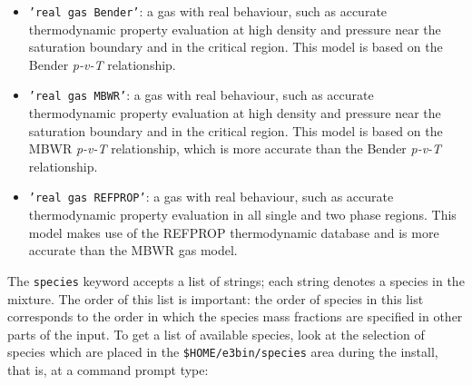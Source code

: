 \begin{itemize}
 \item \texttt{'real gas Bender'}: a gas with real behaviour, such as accurate thermodynamic property evaluation
                            at high density and pressure near the saturation boundary and in the critical region.
                            This model is based on the Bender \textit{p-v-T} relationship.
 \item \texttt{'real gas MBWR'}: a gas with real behaviour, such as accurate thermodynamic property evaluation
                            at high density and pressure near the saturation boundary and in the critical region.
                            This model is based on the MBWR \textit{p-v-T} relationship, which is more accurate
                            than the Bender \textit{p-v-T} relationship.
 \item \texttt{'real gas REFPROP'}: a gas with real behaviour, such as accurate thermodynamic property evaluation
                            in all single and two phase regions.
                            This model makes use of the REFPROP thermodynamic database and is more accurate than
                            the MBWR gas model.
\end{itemize}

The \texttt{species} keyword accepts a list of strings; each string denotes
a species in the mixture.  The order of this list is important: the order of
species in this list corresponds to the order in which the species mass fractions
are specified in other parts of the input.
To get a list of available species, look at the selection of species which are placed
in the \texttt{\$HOME/e3bin/species} area during the install, 
that is, at a command prompt type:

